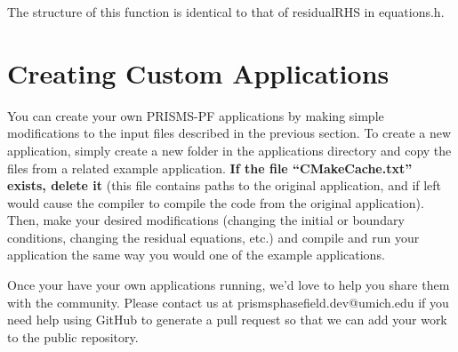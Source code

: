 \documentclass[10pt]{article} %
\begin{document}
The structure of this function is identical to that of residualRHS in equations.h.


\section{Creating Custom Applications}
You can create your own PRISMS-PF applications by making simple modifications to the input files described in the previous section. To create a new application, simply create a new folder in the applications directory and copy the files from a related example application. \textbf{If the file ``CMakeCache.txt'' exists, delete it} (this file contains paths to the original application, and if left would cause the compiler to compile the code from the original application). Then, make your desired modifications (changing the initial or boundary conditions, changing the residual equations, etc.) and compile and run your application the same way you would one of the example applications.

Once your have your own applications running, we'd love to help you share them with the community. Please contact us at prismsphasefield.dev@umich.edu if you need help using GitHub to generate a pull request so that we can add your work to the public repository.
\end{document}
